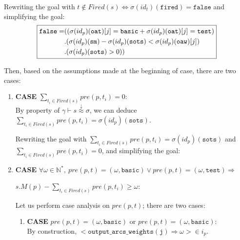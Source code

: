 \documentclass[dvipsnames,12pt]{article}
\begin{document}
\begin{niproof}
\begin{itemize}
\begin{itemize}
\begin{itemize}
        Rewriting the goal with
        $t\notin{}Fired(s)\Leftrightarrow\sigma(id_t)(\texttt{fired})=\mathtt{false}$
        and simplifying the goal:
        \begin{equation*}
          \fbox{$\begin{split}
              \mathtt{false}=& ((\sigma(id_p)(\texttt{oat})[j]=\mathtt{basic}+\sigma(id_p)(\texttt{oat})[j]=\mathtt{test}) \\
              & .(\sigma(id_p)(\texttt{sm})-\sigma(id_p)(\texttt{sots})<\sigma(id_p)(\texttt{oaw})[j])\\
              & .(\sigma(id_p)(\texttt{sots})>0))\\
            \end{split}$}
        \end{equation*}

        Then, based on the assumptions made at the beginning of case,
        there are two cases:
        \begin{enumerate}
        \item \textbf{CASE}
          $\sum\limits_{t_i\in{}Fired(s)}pre(p,t_i)=0$:\\
          
          By property of
          $\gamma\vdash{}s\stackrel{\downarrow}{\approx}\sigma$, we
          can deduce
          $\sum\limits_{t_i\in{}Fired(s)}pre(p,t_i)=\sigma(id_p)(\texttt{sots})$.

          Rewriting the goal with
          $\sum\limits_{t_i\in{}Fired(s)}pre(p,t_i)=\sigma(id_p)(\texttt{sots})$
          and $\sum\limits_{t_i\in{}Fired(s)}pre(p,t_i)=0$, and
          simplifying the goal: 
          
        \item \textbf{CASE}
          $\forall{}\omega\in\mathbb{N}^{*},~pre(p,t)=(\omega,\mathtt{basic})\lor{}pre(p,t)=(\omega,\mathtt{test})
          \Rightarrow{}$

          \hspace{7ex}$s.M(p)-\sum\limits_{t_i\in{}Fired(s)}pre(p,t_i)\ge\omega$:

          Let us perform case analysis on $pre(p,t)$; there are two
          cases:

          \begin{enumerate}
          \item \textbf{CASE} $pre(p,t)=(\omega,\mathtt{basic})$ or $pre(p,t)=(\omega,\mathtt{basic})$:\\
            \noindent{}By construction,
            ${<}\mathtt{output\_arcs\_weights(j)\Rightarrow{}}\omega{>}\in{}i_p$.
            

\end{enumerate}
\end{enumerate}
\end{itemize}
\end{itemize}
\end{itemize}
\end{niproof}
\end{document}
